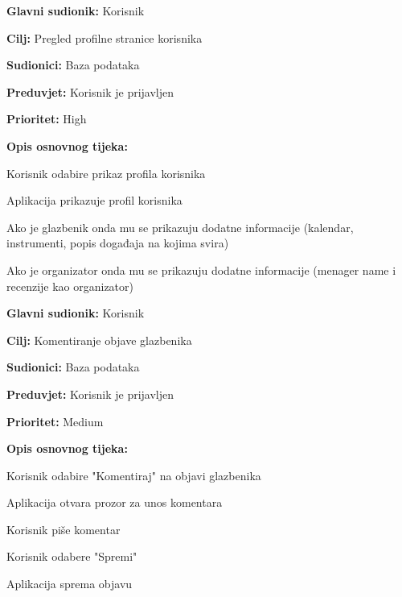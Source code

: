 \noindent {}
	\begin{packed_item}
	    	
    	\item \textbf{Glavni sudionik: }Korisnik
    	\item \textbf{Cilj:} Pregled profilne stranice korisnika
    	\item \textbf{Sudionici:} Baza podataka
    	\item \textbf{Preduvjet:} Korisnik je prijavljen
    	\item \textbf{Prioritet:} High
    	\item \textbf{Opis osnovnog tijeka:} 
    	
    	\item[] \begin{packed_enum}

    		\item Korisnik odabire prikaz profila korisnika
    		\item Aplikacija prikazuje profil korisnika
    		\item[] \begin{packed_enum}

    			\item Ako je glazbenik onda mu se prikazuju dodatne informacije (kalendar, instrumenti, popis događaja na kojima svira)
    			\item Ako je organizator onda mu se prikazuju dodatne informacije (menager name i recenzije kao organizator)
    		\end{packed_enum}
    	\end{packed_enum}
	\end{packed_item}
	    
\noindent {}
   	\begin{packed_item}
   		
   		\item \textbf{Glavni sudionik:} Korisnik
   		\item  \textbf{Cilj:} Komentiranje objave glazbenika
   		\item  \textbf{Sudionici:} Baza podataka
   		\item  \textbf{Preduvjet:} Korisnik je prijavljen
   		\item  \textbf{Prioritet:} Medium
   		\item  \textbf{Opis osnovnog tijeka:} 
   		
   		\item[] \begin{packed_enum}
   			\item Korisnik odabire "Komentiraj" na objavi glazbenika
   			\item Aplikacija otvara prozor za unos komentara
   			\item Korisnik piše komentar
   			\item Korisnik odabere "Spremi"
   			\item Aplikacija sprema objavu
   		\end{packed_enum}
   	\end{packed_item}
    	
